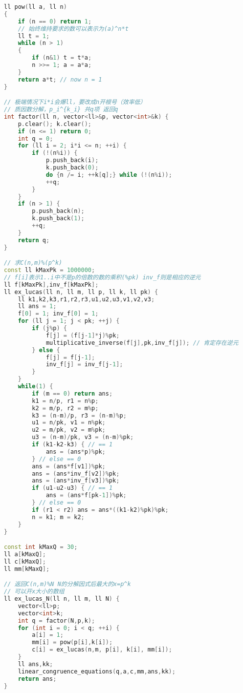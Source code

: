 \begin{lstlisting}[language={c++}]
ll pow(ll a, ll n)
{   
	if (n == 0) return 1;
	// 始终维持要求的数可以表示为(a)^n*t
	ll t = 1;
	while (n > 1)
	{
		if (n&1) t = t*a;
		n >>= 1; a = a*a;
	}
	return a*t; // now n = 1
}

// 极端情况下i*i会爆ll，要改成n开根号（效率低）
// 质因数分解，p_i^{k_i} 共q项 返回q
int factor(ll n, vector<ll>&p, vector<int>&k) {
	p.clear(); k.clear();
	if (n <= 1) return 0;
	int q = 0;
	for (ll i = 2; i*i <= n; ++i) {
		if (!(n%i)) {
			p.push_back(i);
			k.push_back(0);
			do {n /= i; ++k[q];} while (!(n%i));
			++q;
		}
	}
	if (n > 1) {
		p.push_back(n);
		k.push_back(1);
		++q;
	}
	return q;
}

// 求C(n,m)%(p^k)
const ll kMaxPk = 1000000;
// f[i]表示1..i中不是p的倍数的数的乘积(%pk) inv_f则是相应的逆元
ll f[kMaxPk],inv_f[kMaxPk];
ll ex_lucas(ll n, ll m, ll p, ll k, ll pk) {
	ll k1,k2,k3,r1,r2,r3,u1,u2,u3,v1,v2,v3;
	ll ans = 1;
	f[0] = 1; inv_f[0] = 1;
	for (ll j = 1; j < pk; ++j) {
		if (j%p) {
			f[j] = (f[j-1]*j)%pk;
			multiplicative_inverse(f[j],pk,inv_f[j]); // 肯定存在逆元
		} else {
			f[j] = f[j-1];
			inv_f[j] = inv_f[j-1];
		}
	}
	while(1) {
		if (m == 0) return ans;
		k1 = n/p, r1 = n%p;
		k2 = m/p, r2 = m%p;
		k3 = (n-m)/p, r3 = (n-m)%p;
		u1 = n/pk, v1 = n%pk;
		u2 = m/pk, v2 = m%pk;
		u3 = (n-m)/pk, v3 = (n-m)%pk;
		if (k1-k2-k3) { // == 1
			ans = (ans*p)%pk;
		} // else == 0
		ans = (ans*f[v1])%pk;
		ans = (ans*inv_f[v2])%pk;
		ans = (ans*inv_f[v3])%pk;
		if (u1-u2-u3) { // == 1
			ans = (ans*f[pk-1])%pk;
		} // else == 0
		if (r1 < r2) ans = ans*((k1-k2)%pk)%pk;
		n = k1; m = k2;
	}
}

const int kMaxQ = 30;
ll a[kMaxQ];
ll c[kMaxQ];
ll mm[kMaxQ];

// 返回C(n,m)%N N的分解因式后最大的x=p^k
// 可以开x大小的数组
ll ex_lucas_N(ll n, ll m, ll N) {
	vector<ll>p;
	vector<int>k;
	int q = factor(N,p,k);
	for (int i = 0; i < q; ++i) {
		a[i] = 1;
		mm[i] = pow(p[i],k[i]);
		c[i] = ex_lucas(n,m, p[i], k[i], mm[i]);
	}
	ll ans,kk;
	linear_congruence_equations(q,a,c,mm,ans,kk);
	return ans;
}
\end{lstlisting}